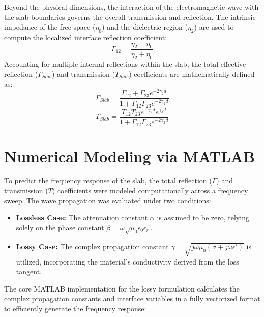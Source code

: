 \documentclass[12pt, a4paper]{article}
\begin{document}
Beyond the physical dimensions, the interaction of the electromagnetic wave with the slab boundaries governs the overall transmission and reflection. The intrinsic impedance of the free space ($\eta_0$) and the dielectric region ($\eta_2$) are used to compute the localized interface reflection coefficient:
\begin{equation}
	\Gamma_{12} = \frac{\eta_2 - \eta_0}{\eta_2 + \eta_0}
\end{equation}
Accounting for multiple internal reflections within the slab, the total effective reflection ($\Gamma_{Slab}$) and transmission ($T_{Slab}$) coefficients are mathematically defined as:
\begin{equation}
	\Gamma_{Slab} = \frac{\Gamma_{12} + \Gamma_{23}e^{-2\gamma_2 d}}{1 + \Gamma_{12}\Gamma_{23}e^{-2\gamma_2 d}}
\end{equation}
\begin{equation}
	T_{Slab} = \frac{T_{12}T_{23}e^{-\gamma_2 d}e^{\gamma_3 d}}{1 + \Gamma_{12}\Gamma_{23}e^{-2\gamma_2 d}}
\end{equation}

\section{Numerical Modeling via MATLAB}
To predict the frequency response of the slab, the total reflection ($\Gamma$) and transmission ($T$) coefficients were modeled computationally across a frequency sweep. The wave propagation was evaluated under two conditions:
\begin{itemize}
	\item \textbf{Lossless Case:} The attenuation constant $\alpha$ is assumed to be zero, relying solely on the phase constant $\beta = \omega\sqrt{\mu_0 \epsilon_0 \epsilon_r}$.
	\item \textbf{Lossy Case:} The complex propagation constant $\gamma = \sqrt{j\omega\mu_0(\sigma + j\omega\epsilon')}$ is utilized, incorporating the material's conductivity derived from the loss tangent.
\end{itemize}

The core MATLAB implementation for the lossy formulation calculates the complex propagation constants and interface variables in a fully vectorized format to efficiently generate the frequency response:
\end{document}
